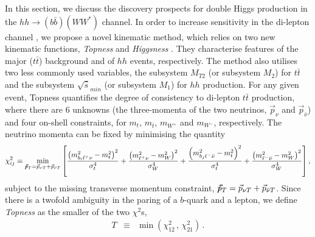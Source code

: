 In this section, we discuss the discovery prospects for double Higgs production in the $hh \to (b\bar b) (W W^*)$ channel. In order to increase sensitivity in the di-lepton channel \cite{CMS:2015nat,CMS:2017cwx,Adhikary:2017jtu}, we propose a novel kinematic method, which relies on two new kinematic functions, {\it Topness} and {\it Higgsness} \cite{Kim:2018cxf}. They characterise features of the major ($t\bar t$) background and of $hh$ events, respectively. The method also utilises two less commonly used variables, the subsystem $M_{T2}$ (or subsystem $M_2$) \cite{Lester:1999tx,Burns:2008va,Barr:2011xt} for $t\bar t$ and the subsystem $\sqrt{\hat {s}}_{min}$ (or subsystem $M_1$) \cite{Konar:2008ei,Konar:2010ma,Barr:2011xt} for $hh$ production.
%
For any given event, Topness \cite{Graesser:2012qy,Kim:2018cxf} quantifies the degree of consistency to di-lepton $t\bar t$ production, where there are 6 unknowns (the three-momenta of the two neutrinos, $\vec p_{\nu}$ and $\vec p_{\bar\nu}$) and four on-shell constraints, for
$m_t$, $m_{\bar t}$, $m_{W^+}$ and $m_{W^-}$, respectively. The neutrino momenta can be fixed by minimising the quantity 
%
\begin{eqnarray}
\chi^2_{ij} \equiv \min_{\tiny {/\!\!\!\vec{ p}_T} = \vec p_{\nu T} + \vec p_{ \bar\nu T}}  \left [ 
\frac{\left ( m^2_{b_i \ell^+ \nu} - m^2_t \right )^2}{\sigma_t^4}    +
\frac{\left ( m^2_{\ell^+ \nu} - m^2_W \right )^2}{\sigma_W^4}   \label{eq:tt}  
 + \frac{\left ( m^2_{b_j \ell^- \bar \nu} - m^2_t \right )^2}{\sigma_t^4}  +
\frac{\left ( m^2_{\ell^- \bar\nu} - m^2_W \right )^2}{\sigma_W^4}   \right ]  , 
\end{eqnarray}
%
subject to the missing transverse momentum constraint, $ {/\!\!\!\vec{ p}_T} = \vec p_{\nu T} + \vec p_{ \bar\nu T}$. 
Since there is a twofold ambiguity in the paring of a $b$-quark and a lepton, we define {\it Topness} as the smaller of the two $\chi^2$s,
\begin{eqnarray}
T &\equiv&  { \min} \left ( \chi^2_{12} \, , \, \chi^2_{21} \right ) \, .
\end{eqnarray}

